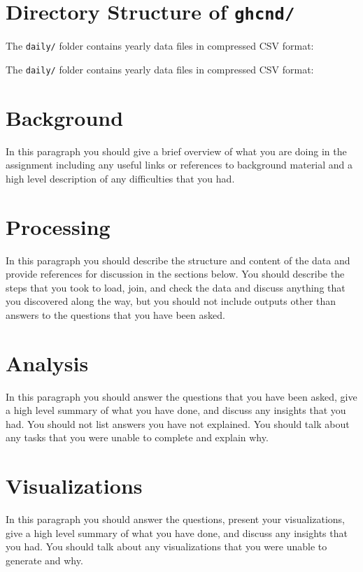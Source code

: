 \documentclass[11pt]{article}
\begin{document}
\section*{Directory Structure of \texttt{ghcnd/}}

The \texttt{daily/} folder contains yearly data files in compressed CSV format:

\bigskip
\noindent The \texttt{daily/} folder contains yearly data files in compressed CSV format:


\section{Background}

In this paragraph you should give a brief overview of what you are doing in the assignment including any useful links or references to background material and a high level description of any difficulties that you had.

\section{Processing}

In this paragraph you should describe the structure and content of the data and provide references for discussion in the sections below. You should describe the steps that you took to load, join, and check the data and discuss anything that you discovered along the way, but you should not include outputs other than answers to the questions that you have been asked.

\section{Analysis}

In this paragraph you should answer the questions that you have been asked, give a high level summary of what you have done, and discuss any insights that you had. You should not list answers you have not explained. You should talk about any tasks that you were unable to complete and explain why.

\section{Visualizations}

In this paragraph you should answer the questions, present your visualizations, give a high level summary of what you have done, and discuss any insights that you had. You should talk about any visualizations that you were unable to generate and why.
\end{document}
